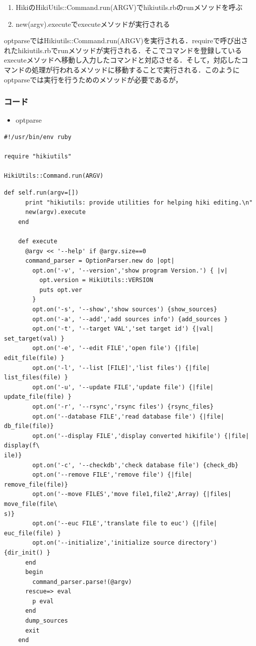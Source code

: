 \begin{enumerate}
\item HikiのHikiUtils::Command.run(ARGV)でhikiutils.rbのrunメソッドを呼ぶ
\item new(argv).executeでexecuteメソッドが実行される
\end{enumerate}
optparseではHikiutils::Command.run(ARGV)を実行される．requireで呼び出されたhikiutils.rbでrunメソッドが実行される．そこでコマンドを登録しているexecuteメソッドへ移動し入力したコマンドと対応させる．そして，対応したコマンドの処理が行われるメソッドに移動することで実行される．このようにoptparseでは実行を行うためのメソッドが必要であるが，

\subsubsection{コード}
\begin{itemize}
\item optparse
\end{itemize}\begin{lstlisting}[style=customRuby]
#!/usr/bin/env ruby                                                             

require "hikiutils"

HikiUtils::Command.run(ARGV)
\end{lstlisting}\begin{lstlisting}[style=customRuby]
    def self.run(argv=[])
      print "hikiutils: provide utilities for helping hiki editing.\n"
      new(argv).execute
    end

    def execute
      @argv << '--help' if @argv.size==0
      command_parser = OptionParser.new do |opt|
        opt.on('-v', '--version','show program Version.') { |v|
          opt.version = HikiUtils::VERSION
          puts opt.ver
        }
        opt.on('-s', '--show','show sources') {show_sources}
        opt.on('-a', '--add','add sources info') {add_sources }
        opt.on('-t', '--target VAL','set target id') {|val| set_target(val) }
        opt.on('-e', '--edit FILE','open file') {|file| edit_file(file) }
        opt.on('-l', '--list [FILE]','list files') {|file| list_files(file) }
        opt.on('-u', '--update FILE','update file') {|file| update_file(file) }
        opt.on('-r', '--rsync','rsync files') {rsync_files}
        opt.on('--database FILE','read database file') {|file| db_file(file)}
        opt.on('--display FILE','display converted hikifile') {|file| display(f\
ile)}
        opt.on('-c', '--checkdb','check database file') {check_db}
        opt.on('--remove FILE','remove file') {|file| remove_file(file)}
        opt.on('--move FILES','move file1,file2',Array) {|files| move_file(file\
s)}
        opt.on('--euc FILE','translate file to euc') {|file| euc_file(file) }
        opt.on('--initialize','initialize source directory') {dir_init() }
      end
      begin
        command_parser.parse!(@argv)
      rescue=> eval
        p eval
      end
      dump_sources
      exit
    end  
\end{lstlisting}
